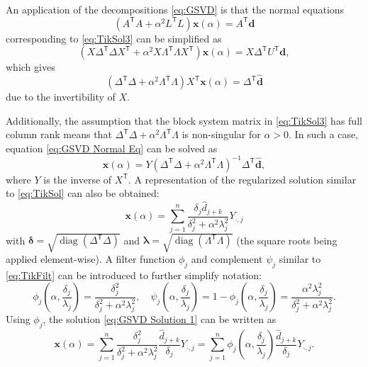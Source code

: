 \documentclass[12pt]{article}
\newcommand{\dVec}{\mathbf{d}}	%
\newcommand{\xVec}{\mathbf{x}}	%
\newcommand{\trans}[1]{{#1}^\mathsf{T}}	%
\newcommand{\inv}[1]{{#1}^{-1}}	%
\DeclareMathOperator{\diag}{diag}	%
\newcommand{\regparam}{\alpha}  %
\newcommand{\filt}{\phi}
\newcommand{\mfilt}{\psi}
\newcommand{\svd}[1]{\widehat{#1}}	%
\begin{document}
An application of the decompositions \eqref{eq:GSVD} is that the normal equations 
\[(\trans{A}A + \regparam^2 \trans{L}L)\xVec(\regparam) = \trans{A}\dVec\] corresponding to \eqref{eq:TikSol3} can be simplified as 
\[(X\trans{\Delta}\Delta\trans{X} + \regparam^2 X\trans{\Lambda}\Lambda\trans{X})\xVec(\regparam) = X\trans{\Delta}\trans{U}\dVec,\]
which gives 
\begin{equation}
    \label{eq:GSVD Normal Eq}
    (\trans{\Delta}\Delta + \regparam^2 \trans{\Lambda}\Lambda)\trans{X}\xVec(\regparam) = \trans{\Delta}\svd{\dVec}
\end{equation}
due to the invertibility of $X$. \par
Additionally, the assumption that the block system matrix in \eqref{eq:TikSol3} has full column rank means that $\trans{\Delta}\Delta + \regparam^2 \trans{\Lambda}\Lambda$ is non-singular for $\regparam > 0$. In such a case, equation \eqref{eq:GSVD Normal Eq} can be solved as
\begin{equation}
    \label{eq:GSVD Normal Eq Sol}
    \xVec(\regparam) = Y\inv{\left(\trans{\Delta}\Delta + \regparam^2 \trans{\Lambda}\Lambda\right)}\trans{\Delta}\svd{\dVec},
\end{equation}
where $Y$ is the inverse of $\trans{X}$. A representation of the regularized solution similar to \eqref{eq:TikSol} can also be obtained:
\begin{equation}
\label{eq:GSVD Solution 1}
\xVec(\regparam) = \sum_{j = 1}^{n} \frac{\delta_j \svd{d}_{j+k}}{\delta^2_j + \regparam^2 \lambda^2_j}Y_{\cdot,j}
\end{equation}
with $\bm{\delta} = \sqrt{\diag(\trans{\Delta}\Delta)}$ and $\bm{\lambda} = \sqrt{\diag(\trans{\Lambda}\Lambda)}$ (the square roots being applied element-wise).  A filter function $\filt_j$ and complement $\mfilt_j$ similar to \eqref{eq:TikFilt} can be introduced to further simplify notation:
\begin{equation}
\label{eq:Filter functions}
\filt_j\left(\regparam,\frac{\delta_j}{\lambda_j}\right) = \frac{\delta^2_j}{\delta^2_j + \regparam^2 \lambda^2_j}, \quad \mfilt_j\left(\regparam,\frac{\delta_j}{\lambda_j}\right) = 1 - \filt_j\left(\regparam,\frac{\delta_j}{\lambda_j}\right) = \frac{\regparam^2 \lambda^2_j}{\delta^2_j + \regparam^2 \lambda^2_j}.
\end{equation}
Using $\filt_j$, the solution \eqref{eq:GSVD Solution 1} can be written as
\begin{equation}
\label{eq:GSVD Solution 2}
\xVec(\regparam) = \sum_{j = 1}^{n} \frac{\delta^2_j}{\delta^2_j + \regparam^2 \lambda^2_j} \frac{\svd{d}_{j+k}}{\delta_j} Y_{\cdot,j} = \sum_{j = 1}^{n} \filt_j\left(\regparam,\frac{\delta_j}{\lambda_j}\right) \frac{\svd{d}_{j+k}}{\delta_j} Y_{\cdot,j}.
\end{equation} 
\end{document}
